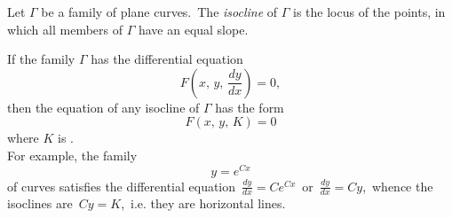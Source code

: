 \documentclass[12pt]{article}
\theoremstyle{definition}
\begin{document}
Let $\Gamma$ be a family of plane curves.\, The {\em isocline} of $\Gamma$ is the locus of the points, in which all members of $\Gamma$ have an equal slope.

If the family $\Gamma$ has the differential equation
$$F(x,\,y,\,\frac{dy}{dx}) = 0,$$
then the equation of any isocline of $\Gamma$ has the form
$$F(x,\,y,\,K) = 0$$
where $K$ is .\\

For example, the family
$$y = e^{Cx}$$
of  curves satisfies the differential equation\, $\frac{dy}{dx} = Ce^{Cx}$\, or\, $\frac{dy}{dx} = Cy$,\, whence the isoclines are\, $Cy =K$,\, i.e. they are horizontal lines.\\



\end{document}
